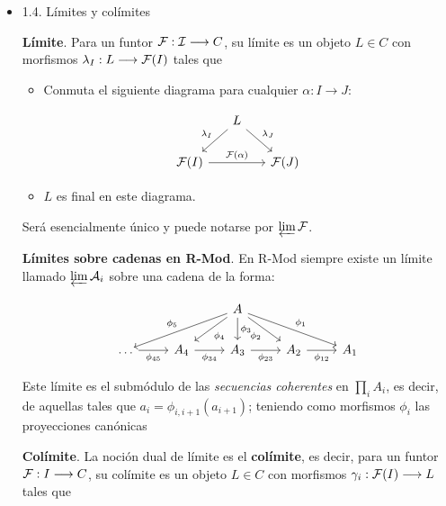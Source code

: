 \documentclass[11pt]{article}
\begin{document}
\begin{itemize}
\item 1.4. Límites y colímites
\label{sec-4-4-1-3}

\begin{definition}
\textbf{Límite}. Para un funtor ${\cal F}: {\cal I} \longrightarrow C$, su límite es
un objeto $L \in C$ con morfismos $\lambda_I: L \longrightarrow {\cal F}(I)$ tales que

\begin{itemize}
\item Conmuta el siguiente diagrama para cualquier $\alpha : I \longrightarrow J$:
\end{itemize}

\[ \begin{tikzcd}[column sep=1.5em]
  & L \arrow{dr}{\lambda_J} \arrow{dl}[swap]{\lambda_I} \\
 {\cal F}(I) \arrow{rr}{{\cal F}(\alpha)} && {\cal F}(J)
 \end{tikzcd} \]

\begin{itemize}
\item $L$ es final en este diagrama.
\end{itemize}
\end{definition}

Será esencialmente único y puede notarse por $\varprojlim {\cal F}$.

\begin{theorem}
\textbf{Límites sobre cadenas en R-Mod}. En R-Mod siempre existe un límite llamado \(\varprojlim {\cal A}_i\) sobre una
cadena de la forma:

\[ \begin{tikzcd}
 & & A 
 \arrow{lld}[swap]{\phi_5}
 \arrow{ld}{\phi_4}
 \arrow{d}{\phi_3}
 \arrow{rd}[swap]{\phi_2}
 \arrow{rrd}{\phi_1} 
 & & \\
 \dots \arrow{r}[swap]{\phi_{45}}  &
 A_4 \arrow{r}[swap]{\phi_{34}} &
 A_3 \arrow{r}[swap]{\phi_{23}} &
 A_2 \arrow{r}[swap]{\phi_{12}} &
 A_1
 \end{tikzcd} \]
\end{theorem}

Este límite es el submódulo de las \emph{secuencias coherentes} en $\prod_i A_i$, es decir, de
aquellas tales que $a_i = \phi_{i,i+1}(a_{i+1})$; teniendo como morfismos $\phi_i$ las proyecciones
canónicas


\begin{definition}
\textbf{Colímite}. La noción dual de límite es el \textbf{colímite}, es decir, para
un funtor ${\cal F} : I \longrightarrow C$, su colímite es un objeto $L \in C$ con morfismos $\gamma_i : {\cal F}(I) \longrightarrow L$
tales que


\end{definition}
\end{itemize}
\end{document}
